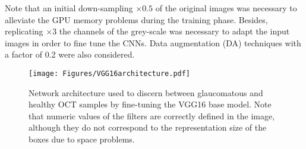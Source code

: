 Note that an initial down-sampling $\times0.5$ of the original images was necessary to alleviate the GPU memory problems during the training phase. Besides, replicating $\times3$ the channels of the grey-scale was necessary to adapt the input images in order to fine tune the CNNs. Data augmentation (DA) techniques with a factor of 0.2 were also considered.
 

\begin{figure}[h]
\centering
\texttt{[image: Figures/VGG16architecture.pdf]}
\caption{Network architecture used to discern between glaucomatous and healthy OCT samples by fine-tuning the VGG16 base model. Note that numeric values of the filters are correctly defined in the image, although they do not correspond to the representation size of the boxes due to space problems.}
\label{fig:VGG16}
\end{figure}

